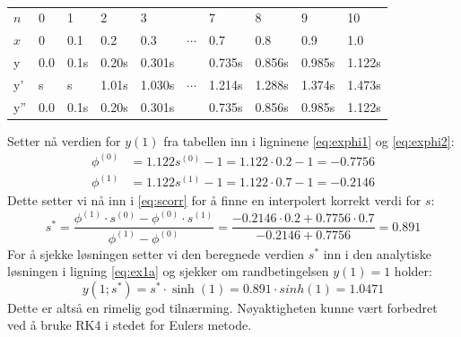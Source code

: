 \begin{table}[H]
  \centering
  \caption{}
  \label{tab:ex1beregn}
  \begin{tabularx}{1.0\textwidth}{X|XXXXXXXXX}
    \toprule
    $n$ & 0   & 1    & 2      & 3      &          & 7      & 8     & 9     & 10    \\
    $x$ & 0   & 0.1  & 0.2    & 0.3    & $\cdots$ & 0.7    & 0.8   & 0.9   & 1.0   \\
    \midrule
    y   & 0.0 & 0.1s & 0.20s  & 0.301s &          & 0.735s & 0.856s & 0.985s & 1.122s \\
    y'  & s   & s    & 1.01s  & 1.030s & $\cdots$ & 1.214s & 1.288s & 1.374s & 1.473s \\
    y'' & 0.0 & 0.1s & 0.20s  & 0.301s &          & 0.735s & 0.856s & 0.985s & 1.122s \\
    \bottomrule
  \end{tabularx}
\end{table}

\noindent Setter nå verdien for $y(1)$ fra tabellen inn i ligninene \eqref{eq:exphi1} og \eqref{eq:exphi2}:
\begin{align}
  \phi^{(0)} &= 1.122s^{(0)} - 1 = 1.122 \cdot 0.2 - 1 = -0.7756 \\
  \phi^{(1)} &= 1.122s^{(1)} - 1 = 1.122 \cdot 0.7 - 1 = -0.2146
\end{align}
Dette setter vi nå inn i \eqref{eq:scorr} for å finne en interpolert korrekt verdi for $s$:
\begin{equation}
  s^* = \dfrac{\phi^{(1)}\cdot s^{(0)} - \phi^{(0)}\cdot s^{(1)}}{\phi^{(1)} - \phi^{(0)}}
      = \frac{-0.2146 \cdot 0.2 + 0.7756 \cdot 0.7}{-0.2146+0.7756} = 0.891
\end{equation}
For å sjekke løsningen setter vi den beregnede verdien $s^*$ inn i den analytiske løsningen i ligning \eqref{eq:ex1a} og sjekker om randbetingelsen $y(1) = 1$ holder:
\begin{equation}
  y(1;s^*) = s^* \cdot \sinh(1) = 0.891 \cdot sinh(1) = 1.0471
\end{equation}
Dette er altså en rimelig god tilnærming. Nøyaktigheten kunne vært forbedret ved å bruke RK4 i stedet for Eulers metode.



\clearpage



